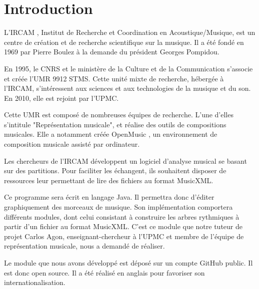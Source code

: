\section{Introduction}


L'IRCAM \cite{ircam}, Institut de Recherche et Coordination en Acoustique/Musique, est un centre de création et de recherche scientifique sur la musique. Il a été fondé en 1969 par Pierre Boulez à la demande du président Georges Pompidou. 

\par
En 1995, le CNRS et le ministère de la Culture et de la Communication s'associe et créée l'UMR 9912 STMS. Cette unité mixte de recherche, hébergée à l'IRCAM, s'intéressent aux sciences et aux technologies de la musique et du son. En 2010, elle est rejoint par l'UPMC.

\par
Cette UMR est composé de nombreuses équipes de recherche. L'une d'elles s'intitule "Représentation musicale", et réalise des outils de compositions musicales. Elle a notamment créée OpenMusic \cite{openmusic}, un environnement de composition musicale assisté par ordinateur.

\par
Les chercheurs de l'IRCAM développent un logiciel d'analyse musical se basant sur des partitions. Pour faciliter les échangent, ils souhaitent disposer de ressources leur permettant de lire des fichiers au format MusicXML. %


\par
Ce programme sera écrit en langage Java. Il permettra donc d'éditer graphiquement des morceaux de musique. Son implémentation comportera différents modules, dont celui consistant à construire les arbres rythmiques à partir d'un fichier au format MusicXML. C'est ce module que notre tuteur de projet Carlos Agon, enseignant-chercheur à l'UPMC et membre de l'équipe de représentation musicale, nous a demandé de réaliser.

\par
Le module que nous avons développé est déposé sur un compte GitHub \cite{github_pstl} public. Il est donc open source. Il a été réalisé en anglais pour favoriser son internationalisation.
